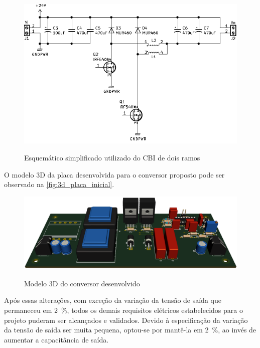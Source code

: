     \begin{figure}[H]
    	\centering
    	\caption{Esquemático simplificado utilizado do CBI de dois ramos}
    	\includegraphics[scale=1.2]{pdf/layout/Esquematico_CBI_simples.pdf}
        \label{fig:esquematico_cbi_1}
    \end{figure}
    
    O modelo 3D da placa desenvolvida para o conversor proposto pode ser observado na \autoref{fig:3d_placa_inicial}.
    
    \begin{figure}[H]
    	\centering
    	\caption{Modelo 3D do conversor desenvolvido}
    	\includegraphics[scale=.35]{pdf/fotos/placa_inicial.png}
        \label{fig:3d_placa_inicial}
    \end{figure}
    
    Após essas alterações, com exceção da variação da tensão de saída que permaneceu em \SI{2}{\%}, todos os demais requisitos elétricos estabelecidos para o projeto puderam ser alcançados e validados. Devido à especificação da variação da tensão de saída ser muita pequena, optou-se por mantê-la em \SI{2}{\%}, ao invés de aumentar a capacitância de saída.
    
